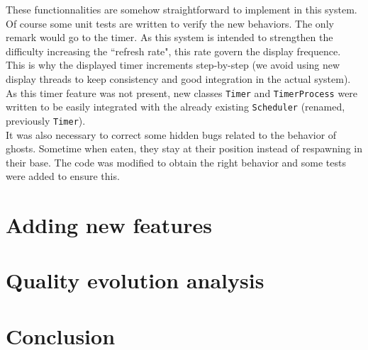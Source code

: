 \documentclass[]{article}
\begin{document}
These functionnalities are somehow straightforward to implement in this system. Of course some unit tests are written to verify the new behaviors. The only remark would go to the timer. As this system is intended to strengthen the difficulty increasing the ``refresh rate", this rate govern the display frequence. This is why the displayed timer increments step-by-step (we avoid using new display threads to keep consistency and good integration in the actual system). As this timer feature was not present, new classes \texttt{Timer} and \texttt{TimerProcess} were written to be easily integrated with the already existing \texttt{Scheduler} (renamed, previously \texttt{Timer}).\\

It was also necessary to correct some hidden bugs related to the behavior of ghosts. Sometime when eaten, they stay at their position instead of respawning in their base. The code was modified to obtain the right behavior and some tests were added to ensure this. 

\newpage
\section{Adding new features}
\newpage
\section{Quality evolution analysis}
\newpage
\section{Conclusion}
\end{document}
